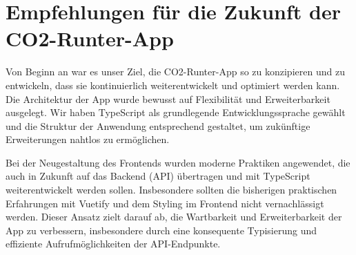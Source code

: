 \section{Empfehlungen für die Zukunft der CO2-Runter-App}

Von Beginn an war es unser Ziel, die CO2-Runter-App so zu konzipieren und zu entwickeln, dass sie kontinuierlich weiterentwickelt und optimiert werden kann. Die Architektur der App wurde bewusst auf Flexibilität und Erweiterbarkeit ausgelegt. Wir haben TypeScript als grundlegende Entwicklungssprache gewählt und die Struktur der Anwendung entsprechend gestaltet, um zukünftige Erweiterungen nahtlos zu ermöglichen.

Bei der Neugestaltung des Frontends wurden moderne Praktiken angewendet, die auch in Zukunft auf das Backend (\acs{API}) übertragen und mit TypeScript weiterentwickelt werden sollen. Insbesondere sollten die bisherigen praktischen Erfahrungen mit Vuetify und dem Styling im Frontend nicht vernachlässigt werden. Dieser Ansatz zielt darauf ab, die Wartbarkeit und Erweiterbarkeit der App zu verbessern, insbesondere durch eine konsequente Typisierung und effiziente Aufrufmöglichkeiten der \acs{API}-Endpunkte.
